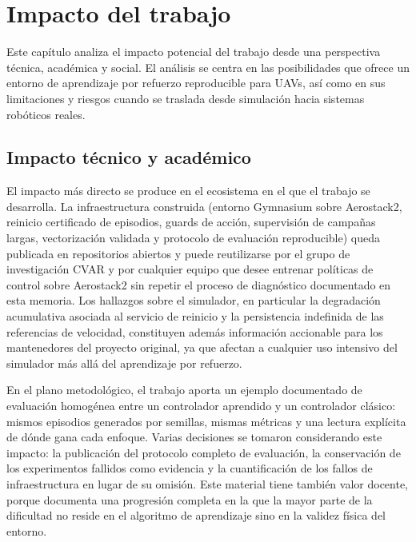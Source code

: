 \chapter{Impacto del trabajo} \label{chp:impacto}

Este capítulo analiza el impacto potencial del trabajo desde una perspectiva
técnica, académica y social. El análisis se centra en las posibilidades que
ofrece un entorno de aprendizaje por refuerzo reproducible para UAVs, así como
en sus limitaciones y riesgos cuando se traslada desde simulación hacia sistemas
robóticos reales.

\section{Impacto técnico y académico} \label{sct:impacto:tecnico}

El impacto más directo se produce en el ecosistema en el que el trabajo se
desarrolla. La infraestructura construida (entorno Gymnasium sobre Aerostack2,
reinicio certificado de episodios, guards de acción, supervisión de campañas
largas, vectorización validada y protocolo de evaluación reproducible) queda
publicada en repositorios abiertos y puede reutilizarse por el grupo de
investigación CVAR y por cualquier equipo que desee entrenar políticas de
control sobre Aerostack2 sin repetir el proceso de diagnóstico documentado en
esta memoria. Los hallazgos sobre el simulador, en particular la degradación
acumulativa asociada al servicio de reinicio y la persistencia indefinida de las
referencias de velocidad, constituyen además información accionable para los
mantenedores del proyecto original, ya que afectan a cualquier uso intensivo del
simulador más allá del aprendizaje por refuerzo.

En el plano metodológico, el trabajo aporta un ejemplo documentado de evaluación
homogénea entre un controlador aprendido y un controlador clásico: mismos
episodios generados por semillas, mismas métricas y una lectura explícita de
dónde gana cada enfoque. Varias decisiones se tomaron considerando este impacto:
la publicación del protocolo completo de evaluación, la conservación de los
experimentos fallidos como evidencia y la cuantificación de los fallos de
infraestructura en lugar de su omisión. Este material tiene también valor
docente, porque documenta una progresión completa en la que la mayor parte de la
dificultad no reside en el algoritmo de aprendizaje sino en la validez física
del entorno.


